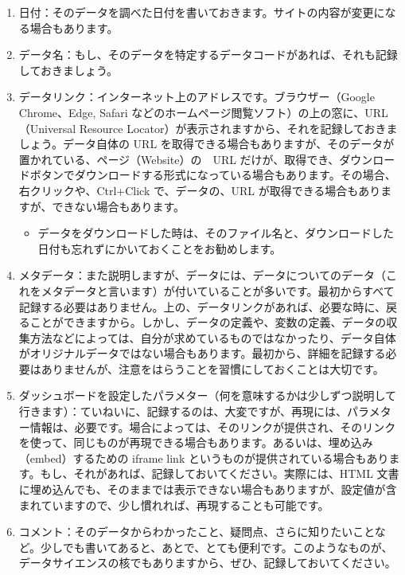 \documentclass[
  xelatex, ja=standard]{bxjsbook}
\providecommand{\tightlist}{%
  \setlength{\itemsep}{0pt}\setlength{\parskip}{0pt}}
\theoremstyle{definition}
\theoremstyle{definition}
\theoremstyle{definition}
\theoremstyle{definition}
\theoremstyle{remark}
\begin{document}
\begin{enumerate}
\def\labelenumi{\arabic{enumi}.}
\item
  日付：そのデータを調べた日付を書いておきます。サイトの内容が変更になる場合もあります。
\item
  データ名：もし、そのデータを特定するデータコードがあれば、それも記録しておきましょう。
\item
  データリンク：インターネット上のアドレスです。ブラウザー（Google Chrome、Edge, Safari などのホームページ閲覧ソフト）の上の窓に、URL（Universal Resource Locator）が表示されますから、それを記録しておきましょう。データ自体の URL を取得できる場合もありますが、そのデータが置かれている、ページ（Website）の　URL だけが、取得でき、ダウンロードボタンでダウンロードする形式になっている場合もあります。その場合、右クリックや、Ctrl+Click で、データの、URL が取得できる場合もありますが、できない場合もあります。

  \begin{itemize}
  \tightlist
  \item
    データをダウンロードした時は、そのファイル名と、ダウンロードした日付も忘れずにかいておくことをお勧めします。
  \end{itemize}
\item
  メタデータ：また説明しますが、データには、データについてのデータ（これをメタデータと言います）が付いていることが多いです。最初からすべて記録する必要はありません。上の、データリンクがあれば、必要な時に、戻ることができますから。しかし、データの定義や、変数の定義、データの収集方法などによっては、自分が求めているものではなかったり、データ自体がオリジナルデータではない場合もあります。最初から、詳細を記録する必要はありませんが、注意をはらうことを習慣にしておくことは大切です。
\item
  ダッシュボードを設定したパラメター（何を意味するかは少しずつ説明して行きます）：ていねいに、記録するのは、大変ですが、再現には、パラメター情報は、必要です。場合によっては、そのリンクが提供され、そのリンクを使って、同じものが再現できる場合もあります。あるいは、埋め込み（embed）するための iframe link というものが提供されている場合もあります。もし、それがあれば、記録しておいてください。実際には、HTML 文書に埋め込んでも、そのままでは表示できない場合もありますが、設定値が含まれていますので、少し慣れれば、再現することも可能です。
\item
  コメント：そのデータからわかったこと、疑問点、さらに知りたいことなど。少しでも書いてあると、あとで、とても便利です。このようなものが、データサイエンスの核でもありますから、ぜひ、記録しておいてください。
\end{enumerate}
\end{document}
